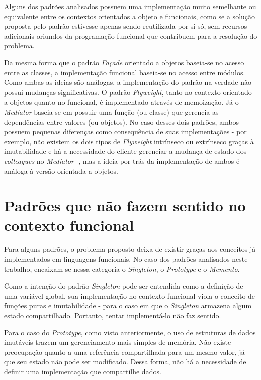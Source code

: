 Alguns dos padrões analisados possuem 
uma implementação muito semelhante ou 
equivalente entre os contextos orientados 
a objeto e funcionais, como se a solução 
proposta pelo padrão estivesse apenas 
sendo reutilizada por si só, sem 
recursos adicionais oriundos da programação 
funcional que contribuem para a 
resolução do problema. 

Da mesma forma que o padrão \textit{Façade} orientado 
a objetos baseia-se no acesso entre as classes, 
a implementação funcional baseia-se no acesso 
entre módulos. Como ambas as ideias são 
análogas, a implementação do padrão na verdade 
não possui mudanças significativas. 
O padrão \textit{Flyweight}, tanto no 
contexto orientado a objetos quanto no funcional, 
é implementado através de memoização. Já o \textit{Mediator} 
baseia-se em possuir uma função (ou classe) que 
gerencia as dependências entre valores (ou objetos). 
No caso desses dois padrões, ambos possuem 
pequenas diferenças como consequência de suas 
implementações - por exemplo, não existem os dois 
tipos de \textit{Flyweight} intrínseco ou extrínseco 
graças à imutabilidade e há a necessidade do 
cliente gerenciar a mudança de estado dos 
\textit{colleagues} no \textit{Mediator} -, mas a ideia 
por trás da implementação de ambos é análoga 
à versão orientada a objetos.

\section{Padrões que não fazem sentido no contexto funcional}

Para alguns padrões, o problema proposto deixa 
de existir graças aos conceitos já implementados 
em linguagens funcionais. No caso dos padrões 
analisados neste trabalho, encaixam-se nessa 
categoria o \textit{Singleton}, o \textit{Prototype} 
e o \textit{Memento}. 

Como a intenção do padrão \textit{Singleton} pode 
ser entendida como a definição de uma variável 
global, sua implementação no contexto funcional 
viola o conceito de funções puras e imutabilidade - 
para o caso em que o \textit{Singleton} armazena algum 
estado compartilhado. Portanto, tentar 
implementá-lo não faz sentido. 

Para o caso do \textit{Prototype}, como visto anteriormente, 
o uso de estruturas de dados imutáveis trazem um 
gerenciamento mais simples de memória. Não existe 
preocupação quanto a uma referência compartilhada 
para um mesmo valor, já que seu estado não pode ser 
modificado. Dessa forma, não há a necessidade de 
definir uma implementação que compartilhe dados.

